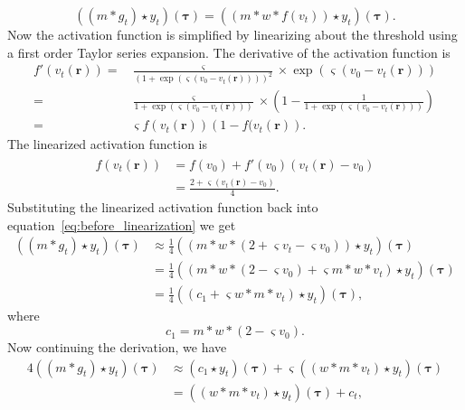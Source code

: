 \documentclass[conference,onecolumn]{IEEEtran}
\begin{document}
\begin{equation}\label{eq:before_linearization}
	((m \ast g_t) \star y_t)(\boldsymbol\tau) = ((m \ast w\ast f(v_t)) \star y_t)(\boldsymbol\tau).
\end{equation}
Now the activation function is simplified by linearizing about the threshold using a first order Taylor series expansion. The derivative of the activation function is
\begin{align}
 f'(v_t\left(\mathbf{r}\right))=& \frac{\varsigma}{\left(1 + \exp \left( \varsigma \left( v_0 - v_t\left(\mathbf{r}\right) \right) \right)\right)^2} \times \exp \left( \varsigma \left( v_0 - v_t\left(\mathbf{r}\right) \right) \right) \nonumber \\
=&\frac{\varsigma}{1 + \exp \left( \varsigma \left( v_0 - v_t\left(\mathbf{r}\right) \right) \right)} \times \left(1-\frac{1}{1 + \exp \left( \varsigma \left( v_0 - v_t\left(\mathbf{r}\right) \right) \right)}\right) \nonumber \\
=& \varsigma f(v_t\left(\mathbf{r}\right))\left( 1-f( v_t\left(\mathbf{r}\right)\right).
\end{align}
The linearized activation function is 
\begin{align}
	\hat{f}(v_t\left(\mathbf{r}\right)) &= f(v_0) + f'(v_0)(v_t\left(\mathbf{r}\right) - v_0) \\
	&= \frac{2 + \varsigma(v_t\left(\mathbf{r}\right) - v_0)}{4}. 
\end{align}	
Substituting the linearized activation function back into equation~\ref{eq:before_linearization} we get
\begin{align}	
	((m \ast g_t) \star y_t)(\boldsymbol\tau) &\approx \frac{1}{4}((m \ast w \ast (2 + \varsigma v_t - \varsigma v_0))\star y_t)(\boldsymbol\tau) \\
	&= \frac{1}{4}((m\ast w \ast (2 -\varsigma v_0) + \varsigma m\ast w\ast v_t) \star y_t)(\boldsymbol\tau) \\
&= \frac{1}{4}((c_1 + \varsigma w \ast m\ast v_t) \star y_t)(\boldsymbol\tau),
\end{align}
where
\begin{equation}
	c_1 = m\ast w\ast (2 - \varsigma v_0).
\end{equation}
Now continuing the derivation, we have
\begin{align}
4((m \ast g_t) \star y_t)(\boldsymbol\tau) &\approx (c_1 \star y_t)(\boldsymbol\tau) + \varsigma ((w \ast m\ast v_t) \star y_t)(\boldsymbol\tau) \\
&= (( w \ast m\ast v_t ) \star y_t)(\boldsymbol\tau) + c_t,
\end{align}
\end{document}

